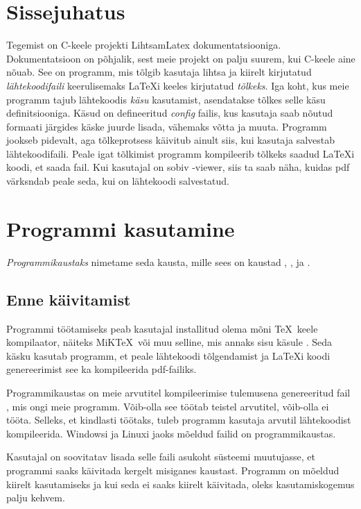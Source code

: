 \documentclass{article}
\begin{document}
\section*{Sissejuhatus}
Tegemist on C-keele projekti LihtsamLatex dokumentatsiooniga. Dokumentatsioon on põhjalik, sest meie projekt on palju suurem, kui C-keele aine nõuab. See on programm, mis tõlgib kasutaja lihtsa ja kiirelt kirjutatud \emph{lähtekoodifaili} keerulisemaks \LaTeX i keeles kirjutatud \emph{tõlkeks}. Iga koht, kus meie programm tajub lähtekoodis \emph{käsu} kasutamist, asendatakse tõlkes selle käsu definitsiooniga. Käsud on defineeritud \emph{config} failis, kus kasutaja saab nõutud formaati järgides käske juurde lisada, vähemaks võtta ja muuta. Programm jookseb pidevalt, aga tõlkeprotsess käivitub ainult siis, kui kasutaja salvestab lähtekoodifaili. Peale igat tõlkimist programm kompileerib tõlkeks saadud \LaTeX i koodi, et saada  fail. Kui kasutajal on sobiv -viewer, siis ta saab näha, kuidas pdf värksndab peale seda, kui on lähtekoodi salvestatud.



\section{Programmi kasutamine}
\emph{Programmikaustaks} nimetame seda kausta, mille sees on kaustad , ,  ja .



\subsection{Enne käivitamist}
Programmi töötamiseks peab kasutajal installitud olema mõni \TeX\ keele kompilaator, näiteks MiK\TeX\ või muu selline, mis annaks sisu käsule . Seda käsku kasutab programm, et peale lähtekoodi tõlgendamist ja \LaTeX i koodi genereerimist see ka kompileerida pdf-failiks.

Programmikaustas on meie arvutitel kompileerimise tulemusena genereeritud fail , mis ongi meie programm. Võib-olla see töötab teistel arvutitel, võib-olla ei tööta. Selleks, et kindlasti töötaks, tuleb programm kasutaja arvutil lähtekoodist kompileerida. Windowsi ja Linuxi jaoks mõeldud  failid on programmikaustas.

Kasutajal on soovitatav lisada selle  faili asukoht süsteemi  muutujasse, et programmi saaks käivitada kergelt misiganes kaustast. Programm on mõeldud kiirelt kasutamiseks ja kui seda ei saaks kiirelt käivitada, oleks kasutamiskogemus palju kehvem.
\end{document}
